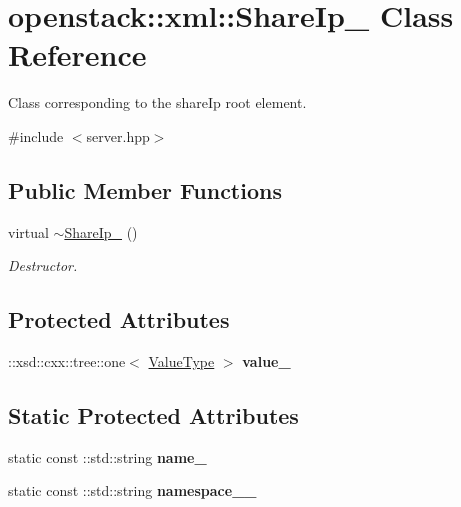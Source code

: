 \hypertarget{classopenstack_1_1xml_1_1ShareIp__}{
\section{openstack::xml::ShareIp\_\- Class Reference}
\label{classopenstack_1_1xml_1_1ShareIp__}
}


Class corresponding to the shareIp root element.  




{\ttfamily \#include $<$server.hpp$>$}

\subsection*{Public Member Functions}
\begin{DoxyCompactItemize}
\item 
\hypertarget{classopenstack_1_1xml_1_1ShareIp___a99b7956e643f8ca69c6a5cc03bec978b}{
virtual \hyperlink{classopenstack_1_1xml_1_1ShareIp___a99b7956e643f8ca69c6a5cc03bec978b}{$\sim$ShareIp\_\-} ()}
\label{classopenstack_1_1xml_1_1ShareIp___a99b7956e643f8ca69c6a5cc03bec978b}

\begin{DoxyCompactList}\small\item\em Destructor. \item\end{DoxyCompactList}\end{DoxyCompactItemize}
\subsection*{Protected Attributes}
\begin{DoxyCompactItemize}
\item 
\hypertarget{classopenstack_1_1xml_1_1ShareIp___abe97e9387f63c23ed95756015b227a21}{
::xsd::cxx::tree::one$<$ \hyperlink{classopenstack_1_1xml_1_1ShareIp}{ValueType} $>$ {\bfseries value\_\-}}
\label{classopenstack_1_1xml_1_1ShareIp___abe97e9387f63c23ed95756015b227a21}

\end{DoxyCompactItemize}
\subsection*{Static Protected Attributes}
\begin{DoxyCompactItemize}
\item 
\hypertarget{classopenstack_1_1xml_1_1ShareIp___a9cda96def8861b65bc537820162caf47}{
static const ::std::string {\bfseries name\_\-}}
\label{classopenstack_1_1xml_1_1ShareIp___a9cda96def8861b65bc537820162caf47}

\item 
\hypertarget{classopenstack_1_1xml_1_1ShareIp___a76b7031a410543bc1e67f01ad2979224}{
static const ::std::string {\bfseries namespace\_\-\_\-}}
\label{classopenstack_1_1xml_1_1ShareIp___a76b7031a410543bc1e67f01ad2979224}

\end{DoxyCompactItemize}
